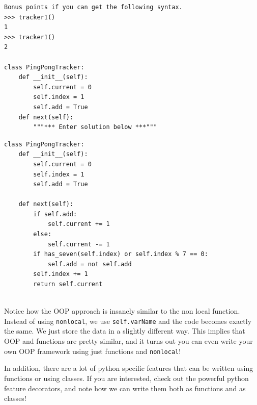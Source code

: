 \documentclass{exam}
\begin{document}
\begin{questions}
\begin{blocksection}
\begin{nonsol}
\begin{lstlisting}
Bonus points if you can get the following syntax.
>>> tracker1()
1
>>> tracker1()
2

class PingPongTracker:
    def __init__(self):
        self.current = 0
        self.index = 1
        self.add = True
    def next(self):
        """*** Enter solution below ***"""
\end{lstlisting}
\end{nonsol}

\begin{solution}[0.3in]
\begin{lstlisting}
class PingPongTracker:
    def __init__(self):
        self.current = 0
        self.index = 1
        self.add = True

    def next(self):
        if self.add:
            self.current += 1
        else:
            self.current -= 1
        if has_seven(self.index) or self.index % 7 == 0:
            self.add = not self.add
        self.index += 1
        return self.current


\end{lstlisting}
Notice how the OOP approach is insanely similar to the non local function.
Instead of using \texttt{nonlocal}, we use \texttt{self.varName} and the code
becomes exactly the same. We just store the data in a slightly different way.
This implies that OOP and functions are pretty similar, and it turns out you can
even write your own OOP framework using just functions and \texttt{nonlocal}!

In addition, there are a lot of python specific features that can be written
using functions or using classes. If you are interested, check out the powerful
python feature decorators, and note how we can write them both as functions and
as classes!
\end{solution}

\end{blocksection}

\end{questions}

\end{document}
